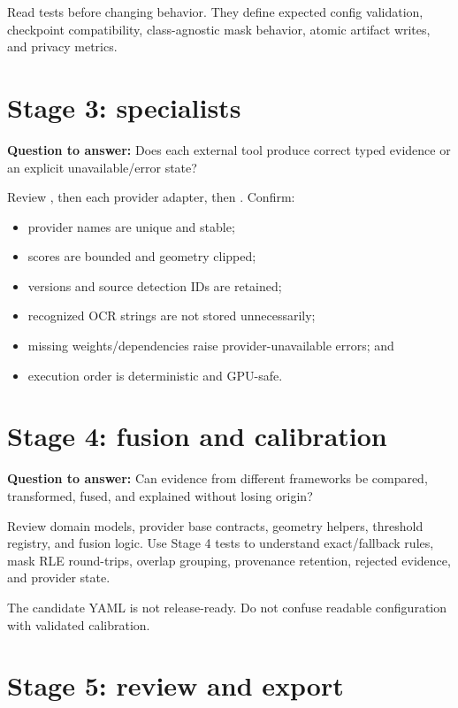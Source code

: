 Read tests before changing behavior. They define expected config validation, checkpoint compatibility, class-agnostic mask behavior, atomic artifact writes, and privacy metrics.

\section{Stage 3: specialists}

\textbf{Question to answer:} Does each external tool produce correct typed evidence or an explicit unavailable/error state?

Review , then each provider adapter, then . Confirm:

\begin{itemize}[leftmargin=6mm]
  \item provider names are unique and stable;
  \item scores are bounded and geometry clipped;
  \item versions and source detection IDs are retained;
  \item recognized OCR strings are not stored unnecessarily;
  \item missing weights/dependencies raise provider-unavailable errors; and
  \item execution order is deterministic and GPU-safe.
\end{itemize}

\section{Stage 4: fusion and calibration}

\textbf{Question to answer:} Can evidence from different frameworks be compared, transformed, fused, and explained without losing origin?

Review domain models, provider base contracts, geometry helpers, threshold registry, and fusion logic. Use Stage 4 tests to understand exact/fallback rules, mask RLE round-trips, overlap grouping, provenance retention, rejected evidence, and provider state.

The candidate YAML is not release-ready. Do not confuse readable configuration with validated calibration.

\section{Stage 5: review and export}

